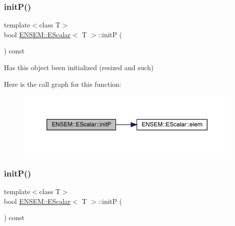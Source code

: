 \mbox{\label{classENSEM_1_1EScalar_ac5b2f0fbee6aa61f80bcd2d0b4d5188c}} 
\subsubsection{\texorpdfstring{initP()}{initP()}\hspace{0.1cm}{\footnotesize\ttfamily [1/3]}}
{\footnotesize\ttfamily template$<$class T$>$ \\
bool \mbox{\hyperlink{classENSEM_1_1EScalar}{E\+N\+S\+E\+M\+::\+E\+Scalar}}$<$ T $>$\+::initP (\begin{DoxyParamCaption}{ }\end{DoxyParamCaption}) const\hspace{0.3cm}{\ttfamily [inline]}}



Has this object been initialized (resized and such) 

Here is the call graph for this function\+:
\nopagebreak
\begin{figure}[H]
\begin{center}
\leavevmode
\includegraphics[width=350pt]{d0/d82/classENSEM_1_1EScalar_ac5b2f0fbee6aa61f80bcd2d0b4d5188c_cgraph}
\end{center}
\end{figure}
\mbox{\label{classENSEM_1_1EScalar_ac5b2f0fbee6aa61f80bcd2d0b4d5188c}} 
\subsubsection{\texorpdfstring{initP()}{initP()}\hspace{0.1cm}{\footnotesize\ttfamily [2/3]}}
{\footnotesize\ttfamily template$<$class T$>$ \\
bool \mbox{\hyperlink{classENSEM_1_1EScalar}{E\+N\+S\+E\+M\+::\+E\+Scalar}}$<$ T $>$\+::initP (\begin{DoxyParamCaption}{ }\end{DoxyParamCaption}) const\hspace{0.3cm}{\ttfamily [inline]}}



